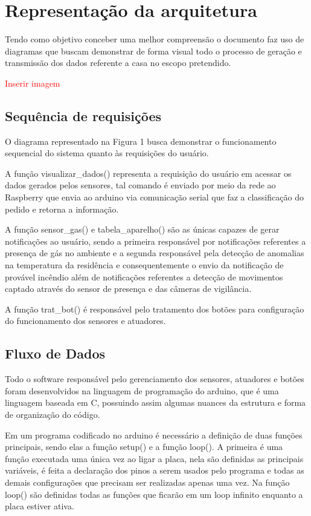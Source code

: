 \section{Representação da arquitetura}
\par Tendo como objetivo conceber uma melhor compreensão o documento faz uso de diagramas que buscam demonstrar de forma visual todo o processo de geração e transmissão dos dados referente a casa no escopo pretendido.

\textcolor{red}{Inserir imagem}

\subsection{Sequência de requisições}

\par O diagrama representado na Figura 1 busca demonstrar o funcionamento sequencial do sistema quanto às requisições do usuário.
\par A função visualizar\_dados() representa a requisição do usuário em acessar os dados gerados pelos sensores, tal comando é enviado por meio da rede ao Raspberry que envia ao arduino via comunicação serial que faz a classificação do pedido e retorna a informação.
\par A função sensor\_gas() e tabela\_aparelho() são as únicas capazes de gerar notificações ao usuário, sendo a primeira responsável por notificações referentes a presença de gás no ambiente e a segunda responsável pela detecção de anomalias na temperatura da residência e consequentemente o envio da notificação de provável incêndio além de notificações referentes a detecção de movimentos captado através do sensor de presença e das câmeras de vigilância.
\par A função trat\_bot() é responsável pelo tratamento dos botões para configuração do funcionamento dos sensores e atuadores.

\subsection{Fluxo de Dados}

\par Todo o software responsável pelo gerenciamento dos sensores, atuadores e botões foram desenvolvidos na linguagem de programação do arduino, que é uma linguagem baseada em C, possuindo assim algumas nuances da estrutura e forma de organização do código.
\par Em um programa codificado no arduino é necessário a definição de duas funções principais, sendo elas a função setup() e a função loop(). A primeira é uma função executada uma única vez ao ligar a placa, nela são definidas as principais variáveis, é feita a declaração dos pinos a serem usados pelo programa e todas as demais configurações que precisam ser realizadas apenas uma vez. Na função loop() são definidas todas as funções que ficarão em um loop infinito enquanto a placa estiver ativa.


